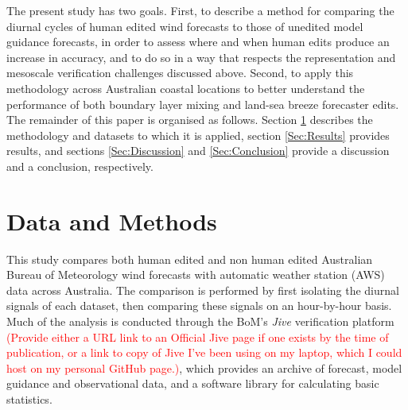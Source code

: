 \documentclass{ametsoc}
\begin{document}
The present study has two goals. First, to describe a method for comparing the diurnal cycles of human edited wind forecasts to those of unedited model guidance forecasts, in order to assess where and when human edits produce an increase in accuracy, and to do so in a way that respects the representation and mesoscale verification challenges discussed above. Second, to apply this methodology across Australian coastal locations to better understand the performance of both boundary layer mixing and land-sea breeze forecaster edits. The remainder of this paper is organised as follows. Section \ref{Sec:Methods} describes the methodology and datasets to which it is applied, section \ref{Sec:Results} provides results, and sections \ref{Sec:Discussion} and \ref{Sec:Conclusion} provide a discussion and a conclusion, respectively.

\section{Data and Methods} \label{Sec:Methods}
This study compares both human edited and non human edited Australian Bureau of Meteorology wind forecasts with automatic weather station (AWS) data across Australia. The comparison is performed by first isolating the diurnal signals of each dataset, then comparing these signals on an hour-by-hour basis. Much of the analysis is conducted through the BoM's \textit{Jive} verification platform \textcolor{red}{(Provide either a URL link to an Official Jive page if one exists by the time of publication, or a link to copy of Jive I've been using on my laptop, which I could host on my personal GitHub page.)}, which provides an archive of forecast, model guidance and observational data, and a software library for calculating basic statistics.  
\end{document}
